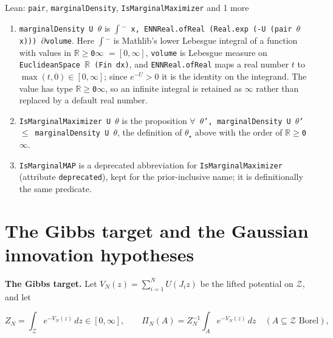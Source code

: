 \documentclass[11pt,a4paper]{article}
\begin{document}
\begin{leanbox}{Lean: \texttt{pair}, \texttt{marginalDensity}, \texttt{IsMarginalMaximizer} and 1 more}
\begin{enumerate}
\item \texttt{marginal\allowbreak{}Density U \ensuremath{\theta}} is \texttt{\ensuremath{\int}\ensuremath{{}^{-}} x, ENNReal.\allowbreak{}of\allowbreak{}Real (Real.\allowbreak{}exp (-\allowbreak{}U (pair \ensuremath{\theta} x))) \ensuremath{\partial}volume}. Here \texttt{\ensuremath{\int}\ensuremath{{}^{-}}} is Mathlib's lower Lebesgue integral of a function with values in \texttt{\ensuremath{\mathbb R}\ensuremath{\ge}0\ensuremath{\infty}} \(=[0,\infty]\), \texttt{volume} is Lebesgue measure on \texttt{Euclidean\allowbreak{}Space \ensuremath{\mathbb R} (Fin dx)}, and \texttt{ENNReal.\allowbreak{}of\allowbreak{}Real} maps a real number \(t\) to \(\max(t,0)\in[0,\infty]\); since \(e^{-U}>0\) it is the identity on the integrand. The value has type \texttt{\ensuremath{\mathbb R}\ensuremath{\ge}0\ensuremath{\infty}}, so an infinite integral is retained as \(\infty\) rather than replaced by a default real number.

\item \texttt{Is\allowbreak{}Marginal\allowbreak{}Maximizer U \ensuremath{\theta}} is the proposition \texttt{\ensuremath{\forall} \ensuremath{\theta}', marginal\allowbreak{}Density U \ensuremath{\theta}' \ensuremath{\le} marginal\allowbreak{}Density U \ensuremath{\theta}}, the definition of \(\theta_\star\) above with the order of \texttt{\ensuremath{\mathbb R}\ensuremath{\ge}0\ensuremath{\infty}}.

\item \texttt{Is\allowbreak{}Marginal\allowbreak{}MAP} is a deprecated abbreviation for \texttt{Is\allowbreak{}Marginal\allowbreak{}Maximizer} (attribute \texttt{deprecated}), kept for the prior-inclusive name; it is definitionally the same predicate.

\end{enumerate}
\end{leanbox}

\section{\texorpdfstring{The Gibbs target and the Gaussian innovation hypotheses}{The Gibbs target and the Gaussian innovation hypotheses}}


\textbf{The Gibbs target.} Let \(V_N(z)=\sum_{i=1}^NU(J_iz)\) be the lifted potential on \(\mathcal Z\), and let


\[Z_N=\int_{\mathcal Z}e^{-V_N(z)}\,dz\in[0,\infty],\qquad\Pi_N(A)=Z_N^{-1}\int_Ae^{-V_N(z)}\,dz\quad(A\subseteq\mathcal Z\text{ Borel}),\]
\end{document}
